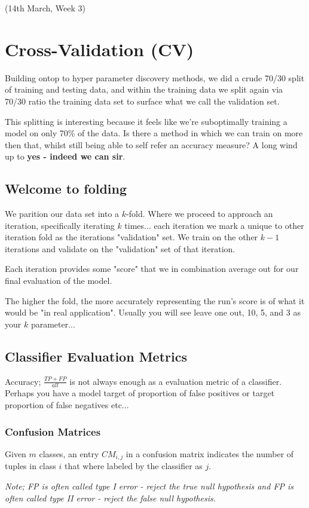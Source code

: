 \documentclass{article}
\begin{document}
(14th March, Week 3)
\section*{Cross-Validation (CV)}
Building ontop to hyper parameter discovery methods, we did a crude 70/30 split of training and testing data, and within the training data we split again via 70/30 ratio the training data set to surface what we call the validation set.

This splitting is interesting because it feels like we're suboptimally training a model on only 70\% of the data. Is there a method in which we can train on more then that, whilst still being able to self refer an accuracy measure? A long wind up to {\bf yes - indeed we can sir}.

\subsection*{Welcome to folding}
We parition our data set into a $k$-fold. Where we proceed to approach an iteration, specifically iterating $k$ times... each iteration we mark a unique to other iteration fold as the iterations "validation" set. We train on the other $k - 1$ iterations and validate on the "validation" set of that iteration.

Each iteration provides some "score" that we in combination average out for our final evaluation of the model.

The higher the fold, the more accurately representing the run's score is of what it would be "in real application". Usually you will see leave one out, 10, 5, and 3 as your $k$ parameter...

\subsection*{Classifier Evaluation Metrics}
Accuracy; $\frac{TP + FP}{all}$ is not always enough as a evaluation metric of a classifier. Perhaps you have a model target of proportion of false positives or target proportion of false negatives etc...

\subsubsection{Confusion Matrices}
Given $m$ classes, an entry $CM_{i,j}$ in a confusion matrix indicates the number of tuples in class $i$ that where labeled by the classifier as $j$.

{\em Note; FP is often called type I error - reject the true null hypothesis and FP is often called type II error - reject the false null hypothesis.}
\end{document}

